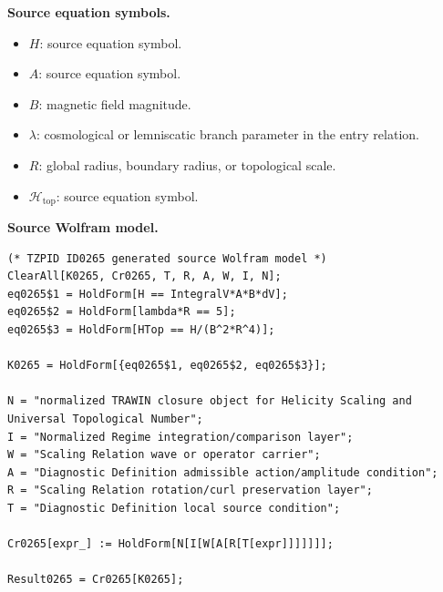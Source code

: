 \begin{minipage}[t]{0.49\linewidth}
\begingroup
\small
\raggedright
\textbf{Source equation symbols.}\par
\begin{itemize}[leftmargin=1.35em,itemsep=1pt,topsep=1pt,parsep=0pt]
    \item $H$: source equation symbol.
    \item $A$: source equation symbol.
    \item $B$: magnetic field magnitude.
    \item $\lambda$: cosmological or lemniscatic branch parameter in the entry relation.
    \item $R$: global radius, boundary radius, or topological scale.
    \item $\mathcal{H}_{\mathrm{top}}$: source equation symbol.
\end{itemize}
\endgroup
\end{minipage}\hfill
\begin{minipage}[t]{0.47\linewidth}
\begingroup
\scriptsize
\raggedright
\textbf{Source Wolfram model.}\par
\begin{Verbatim}[fontsize=\tiny,breaklines=true,breakanywhere=true]
(* TZPID ID0265 generated source Wolfram model *)
ClearAll[K0265, Cr0265, T, R, A, W, I, N];
eq0265$1 = HoldForm[H == IntegralV*A*B*dV];
eq0265$2 = HoldForm[lambda*R == 5];
eq0265$3 = HoldForm[HTop == H/(B^2*R^4)];

K0265 = HoldForm[{eq0265$1, eq0265$2, eq0265$3}];

N = "normalized TRAWIN closure object for Helicity Scaling and Universal Topological Number";
I = "Normalized Regime integration/comparison layer";
W = "Scaling Relation wave or operator carrier";
A = "Diagnostic Definition admissible action/amplitude condition";
R = "Scaling Relation rotation/curl preservation layer";
T = "Diagnostic Definition local source condition";

Cr0265[expr_] := HoldForm[N[I[W[A[R[T[expr]]]]]]];

Result0265 = Cr0265[K0265];
\end{Verbatim}
\endgroup
\end{minipage}

